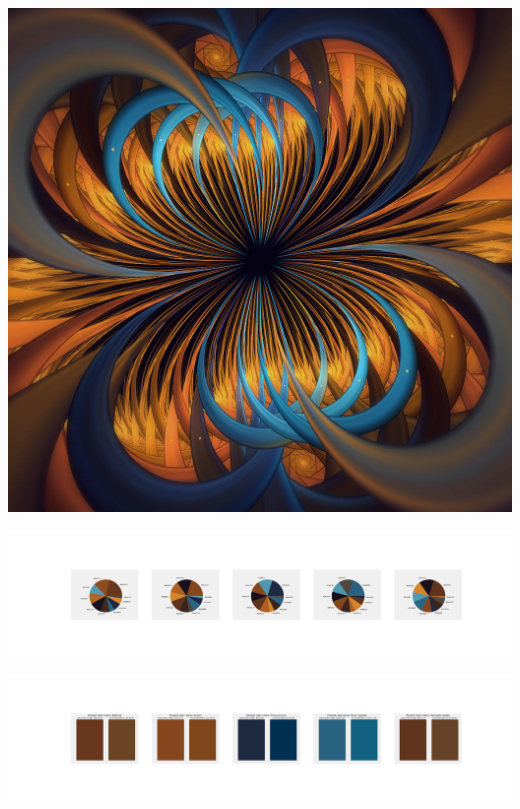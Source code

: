 \documentclass[11pt]{article}
\begin{document}
\begin{landscape}
    \begin{center}
    \includegraphics[width=\textwidth]{./nbimg/file (186).jpg}
    \end{center}

    \begin{center}
    \includegraphics[width=250mm]{./nbimg/pie-96.jpg}
    \end{center}

    \begin{center}
    \includegraphics[width=250mm]{./nbimg/peak-96.jpg}
    \end{center}
    


\end{landscape}
\end{document}
